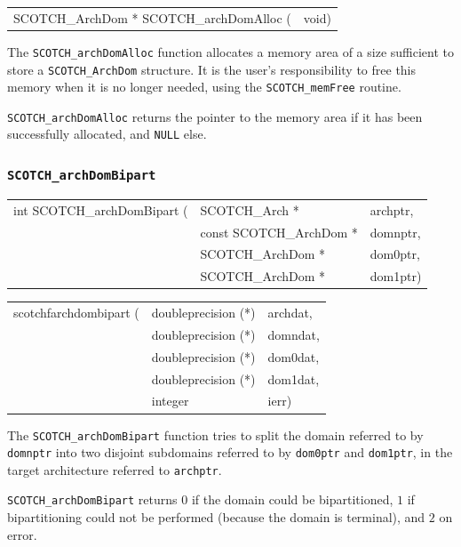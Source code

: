 \begin{itemize}
\progsyn

{\tt\begin{tabular}{l@{}l}
SCOTCH\_ArchDom * SCOTCH\_archDomAlloc ( & void)
\end{tabular}}

\progdes

The {\tt SCOTCH\_archDomAlloc} function allocates a memory area of a
size sufficient to store a {\tt SCOTCH\_\lbt ArchDom} structure. It is
the user's responsibility to free this memory when it is no longer
needed, using the {\tt SCOTCH\_\lbt mem\lbt Free} routine.

\progret

{\tt SCOTCH\_archDomAlloc} returns the pointer to the memory area if it
has been successfully allocated, and {\tt NULL} else.
\end{itemize}

\subsubsection{{\tt SCOTCH\_archDomBipart}}

\begin{itemize}
\progsyn

{\tt\begin{tabular}{l@{}ll}
int SCOTCH\_archDomBipart ( & SCOTCH\_Arch *          & archptr, \\
                            & const SCOTCH\_ArchDom * & domnptr, \\
                            & SCOTCH\_ArchDom *       & dom0ptr, \\
                            & SCOTCH\_ArchDom *       & dom1ptr) \\
\end{tabular}}

{\tt\begin{tabular}{l@{}ll}
scotchfarchdombipart ( & doubleprecision (*) & archdat, \\
                       & doubleprecision (*) & domndat, \\
                       & doubleprecision (*) & dom0dat, \\
                       & doubleprecision (*) & dom1dat, \\
                       & integer             & ierr)
\end{tabular}}

\progdes

The {\tt SCOTCH\_archDomBipart} function tries to split the domain
referred to by {\tt domnptr} into two disjoint subdomains referred to
by {\tt dom0ptr} and {\tt dom1ptr}, in the target architecture
referred to {\tt archptr}.

\progret

{\tt SCOTCH\_archDomBipart} returns $0$ if the domain could be
bipartitioned, $1$ if bipartitioning could not be performed (because
the domain is terminal), and $2$ on error.
\end{itemize}

